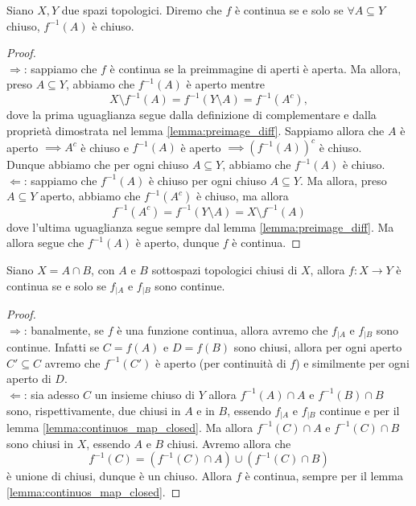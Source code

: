 \begin{lemma}
    Siano $X, Y$ due spazi topologici. Diremo che $f$ è continua se e solo se $\forall A \subseteq Y$ chiuso, $f^{-1}(A)$ è chiuso.
    \label{lemma:continuos_map_closed}
\end{lemma}
\begin{proof} \hspace{1cm} \\
    $\boxed{\Rightarrow}$: sappiamo che $f$ è continua se la preimmagine di aperti è aperta. Ma allora, preso $A \subseteq Y$, abbiamo che $f^{-1}(A)$ è aperto mentre
    $$
        X \setminus f^{-1}(A) = f^{-1}(Y \setminus A) = f^{-1}(A^c),
    $$
    dove la prima uguaglianza segue dalla definizione di complementare e dalla proprietà dimostrata nel lemma \ref{lemma:preimage_diff}. Sappiamo allora che $A$ è aperto $\implies A^c$ è chiuso e $f^{-1}(A)$ è aperto $\implies (f^{-1}(A))^c$ è chiuso. \\
    Dunque abbiamo che per ogni chiuso $A \subseteq Y$, abbiamo che $f^{-1}(A)$ è chiuso. \\
    $\boxed{\Leftarrow}$: sappiamo che $f^{-1}(A)$ è chiuso per ogni chiuso $A \subseteq Y$. Ma allora, preso $A \subseteq Y$ aperto, abbiamo che $f^{-1}(A^c)$ è chiuso, ma allora
    $$
        f^{-1}(A^c) = f^{-1}(Y \setminus A) = X \setminus f^{-1}(A)
    $$
    dove l'ultima uguaglianza segue sempre dal lemma \ref{lemma:preimage_diff}. Ma allora segue che $f^{-1}(A)$ è aperto, dunque $f$ è continua. 
\end{proof}
\begin{lemma}
    Siano $X = A \cap B$, con $A$ e $B$ sottospazi topologici chiusi di $X$, allora $f: X \to Y$ è continua se e solo se $f_{|A}$ e $f_{|B}$ sono continue.
    \label{lemma:gluing_lemma}
\end{lemma}
\begin{proof} \hspace{1cm} \\
    $\boxed{\Rightarrow}$: banalmente, se $f$ è una funzione continua, allora avremo che $f_{|A}$ e $f_{|B}$ sono continue. Infatti se $C = f(A)$ e $D = f(B)$ sono chiusi, allora per ogni aperto $C' \subseteq C$ avremo che
    $f^{-1}(C')$ è aperto (per continuità di $f$) e similmente per ogni aperto di $D$. \\
    $\boxed{\Leftarrow}$:  sia adesso $C$ un insieme chiuso di $Y$ allora $f^{-1}(A) \cap A$ e $f^{-1}(B) \cap B$ sono, rispettivamente, due chiusi in $A$ e in $B$, essendo $f_{|A}$ e $f_{|B}$ continue e per il lemma \ref{lemma:continuos_map_closed}. Ma allora
    $f^{-1}(C) \cap A$ e $f^{-1}(C) \cap B$ sono chiusi in $X$, essendo $A$ e $B$ chiusi. Avremo allora che
    $$
    f^{-1}(C) = (f^{-1}(C) \cap A) \cup (f^{-1}(C) \cap B)
    $$
    è unione di chiusi, dunque è un chiuso. Allora $f$ è continua, sempre per il lemma \ref{lemma:continuos_map_closed}.
\end{proof}
